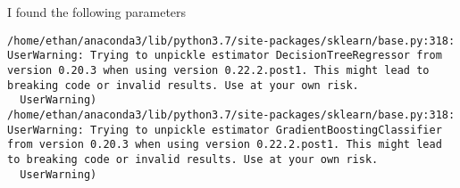 \documentclass[11pt]{article}
\begin{document}
I found the following parameters

    \begin{Verbatim}[commandchars=\\\{\}]
/home/ethan/anaconda3/lib/python3.7/site-packages/sklearn/base.py:318: UserWarning: Trying to unpickle estimator DecisionTreeRegressor from version 0.20.3 when using version 0.22.2.post1. This might lead to breaking code or invalid results. Use at your own risk.
  UserWarning)
/home/ethan/anaconda3/lib/python3.7/site-packages/sklearn/base.py:318: UserWarning: Trying to unpickle estimator GradientBoostingClassifier from version 0.20.3 when using version 0.22.2.post1. This might lead to breaking code or invalid results. Use at your own risk.
  UserWarning)

    \end{Verbatim}
\end{document}
